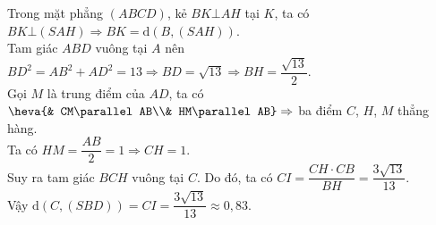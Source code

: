 \begin{ex}
{		Trong mặt phẳng $\left(ABCD\right)$, kẻ $BK\bot AH$ tại $K$, ta có \\
		$BK\bot \left(SAH\right)\Rightarrow BK=\mathrm{d}\left(B,\left(SAH\right) \right)$.\\
		Tam giác $ABD$ vuông tại $A$ nên $BD^2=AB^2+AD^2=13\Rightarrow BD=\sqrt{13}\Rightarrow BH=\dfrac{\sqrt{13}}{2}$.\\
		Gọi $M$ là trung điểm của $AD$, ta có $\heva{& CM\parallel AB\\& HM\parallel AB}\Rightarrow$ ba điểm $C$, $H$, $M$ thẳng hàng.\\
		Ta có $HM=\dfrac{AB}{2}=1\Rightarrow CH=1$.\\
		Suy ra tam giác $BCH$ vuông tại $C$. Do đó, ta có
		$CI=\dfrac{CH \cdot CB}{BH}=\dfrac{3\sqrt{13}}{13}$.\\
		Vậy $\mathrm{d}\left(C,\left(SBD\right) \right)=CI=\dfrac{3\sqrt{13}}{13}\approx 0{,}83$.}
\end{ex}
